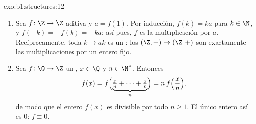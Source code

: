\begin{solution}{exo:b1:structures:12}
\begin{enumerate}
  \item Sea $f \colon \Z \to \Z$ aditiva y $a = f(1)$. Por inducción,
        $f(k) = ka$ para $k \in \N$, y $f(-k) = -f(k) = -ka$: así pues,
        $f$ es la multiplicación por $a$. Recíprocamente, toda
         $k \mapsto ak$ es un : los 
        $(\Z,+) \to (\Z,+)$ son exactamente las multiplicaciones por un
        entero fijo.
  \item Sea $f \colon \Q \to \Z$ un , $x \in \Q$ y
        $n \in \N^*$. Entonces
        \[
        f(x) = f\Bigl(\underbrace{\tfrac xn + \dots +
        \tfrac xn}_{n}\Bigr) = n\,f\Bigl(\frac xn\Bigr) ,
        \]
        de modo que el entero $f(x)$ es divisible por todo $n \geq 1$.
        El único entero así es $0$: $f \equiv 0$.
\end{enumerate}
\end{solution}

